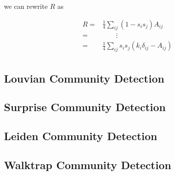 we can rewrite $R$ as

$$
\begin{aligned}
    R =& \frac{1}{4}\sum_{ij}(1 - s_i s_j)A_{ij} \\
      =& \qquad \vdots \\
      =& \frac{1}{4}\sum_{ij}s_i s_j(k_i\delta_{ij} - A_{ij}) \\
\end{aligned}
$$

\subsection{Louvian Community Detection}

\subsection{Surprise Community Detection}

\subsection{Leiden Community Detection}

\subsection{Walktrap Community Detection}

